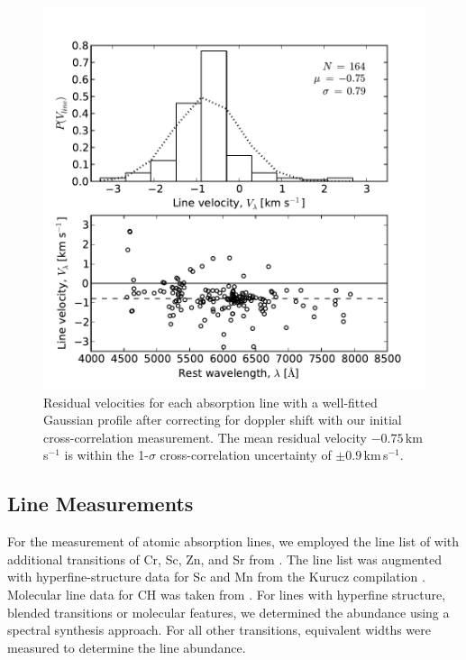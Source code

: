 \documentclass{emulateapj}
\begin{document}
\begin{figure}[h]
	\includegraphics[width=\columnwidth]{./figures/line-velocity.pdf}
	\caption{Residual velocities for each absorption line with a well-fitted Gaussian profile after correcting for  doppler shift with our initial cross-correlation measurement. The mean residual velocity $-0.75$\,km\,s$^{-1}$ is within the 1-$\sigma$ cross-correlation uncertainty of $\pm0.9$\,km\,s$^{-1}$.}
	\label{fig:line-velocities}
\end{figure}


\subsection{Line Measurements}
\label{sec:line-measurements}

For the measurement of atomic absorption lines, we employed the line list of \citet{yong;et-al_2005} with additional transitions of Cr, Sc, Zn, and Sr from \citet{frebel;et-al_2010}. The line list was augmented with hyperfine-structure data for Sc and Mn from the Kurucz compilation \citet{kurucz;1998}. Molecular line data for CH was taken from \citet{plez;et-al_2008,plez;et-al_2009}. For lines with hyperfine structure, blended transitions or molecular features, we determined the abundance using a spectral synthesis approach. For all other transitions, equivalent widths were measured to determine the line abundance.
\end{document}
